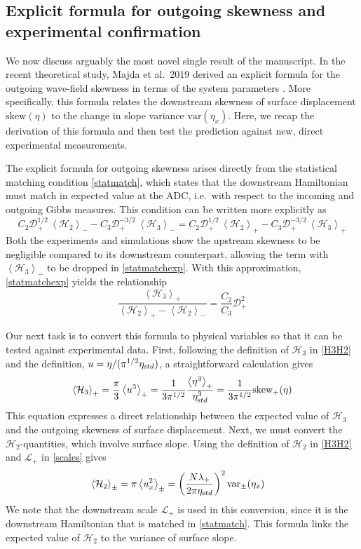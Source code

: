 \documentclass[11pt]{article}
\newcommand{\mean}[1]{\left< #1 \right>}
\newcommand{\etastd}{\eta_{\text std}}
\newcommand{\lam}{\lambda}
\newcommand{\lamdn}{\lam_{+}}
\newcommand{\lamfac}{N}
\newcommand{\drat}{\mathcal{D}}
\newcommand{\dratdn}{\drat_+}
\newcommand{\skw}{\text{skew}}
\newcommand{\skwdn}{\skw_+}
\newcommand{\var}{\text{var}}
\newcommand{\varupdn}{\var_{\pm}}
\newcommand{\lengthscale}{\mathcal{L}}
\newcommand{\Ham}{\mathcal{H}}
\newcommand{\Hthree}{\Ham_{3}}
\newcommand{\Htwo}{\Ham_{2}}
\newcommand{\meanup}[1]{\mean{#1}_{-}}
\newcommand{\meandn}[1]{\mean{#1}_{+}}
\newcommand{\meanupdn}[1]{\mean{#1}_{\pm}}
\begin{document}
\subsection{Explicit formula for outgoing skewness and experimental confirmation}

We now discuss arguably the most novel single result of the manuscript. In the recent theoretical study, Majda et al.~2019 derived an explicit formula for the outgoing wave-field skewness in terms of the system parameters \cite{majda2019}. More specifically, this formula relates the downstream skewness of surface displacement $\skw(\eta)$ to the change in slope variance $\var(\eta_x)$. Here, we recap the derivation of this formula and then test the prediction against new, direct experimental measurements.

The explicit formula for outgoing skewness arises directly from the statistical matching condition \eqref{statmatch}, which states that the downstream Hamiltonian must match in expected value at the ADC, i.e.~with respect to the incoming and outgoing Gibbs measures.
This condition can be written more explicitly as
\begin{equation}
\label{statmatchexp}
C_2 \dratdn^{1/2} \, \meanup{\Htwo} - C_3 \dratdn^{-3/2} \, \meanup{\Hthree } = 
C_2 \dratdn^{1/2} \, \meandn{\Htwo} - C_3 \dratdn^{-3/2} \, \meandn{\Hthree }
\end{equation}
Both the experiments and simulations show the upstream skewness to be negligible compared to its downstream counterpart, allowing the term with $\meanup{\Hthree }$ to be dropped in \eqref{statmatchexp}. With this approximation, \eqref{statmatchexp} yields the relationship
\begin{equation}
\label{H3H2ratio}
\frac{\meandn{\Hthree}} {\meandn{\Htwo} - \meanup{\Htwo}} = \frac{C_2}{C_3} \dratdn^2
\end{equation}

	Our next task is to convert this formula to physical variables so that it can be tested against experimental data. First, following the definition of $\Hthree$ in \eqref{H3H2} and the definition, $u = \eta/(\pi^{1/2} \etastd)$, a straightforward calculation gives
\begin{align}
\label{H3convert}
\meandn{\Hthree} = \frac{\pi}{3} \meandn{u^3} = 
\frac{1}{3 \pi^{1/2}} \frac{\meandn{\eta^3}}{ \etastd^3} = 
\frac{1}{3 \pi^{1/2}} \skwdn(\eta)
\end{align}
This equation expresses a direct relationship between the expected value of $\Hthree$ and the outgoing skewness of surface displacement. Next, we must convert the $\Htwo$-quantities, which involve surface slope. 
Using the definition of $\Htwo$ in \eqref{H3H2} and $\lengthscale_+$ in \eqref{scales} gives
\begin{align}
\label{H2convert}
&\meanupdn{\Htwo} = \pi \meanupdn{ u_x^2} = 
\left( \frac{\lamfac \lamdn}{2 \pi \etastd} \right)^2 \varupdn(\eta_x)
\end{align}
We note that the downstream scale $\lengthscale_+$ is used in this conversion, since it is the downstream Hamiltonian that is matched in \eqref{statmatch}. This formula links the expected value of $\Htwo$ to the variance of surface slope.
\end{document}
